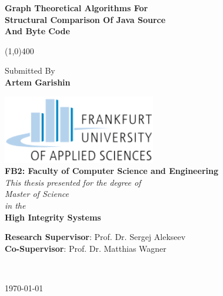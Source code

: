 \documentclass{report}
\newcommand{\Hline}{\par
  \begin{center}
   \line(1,0){400}
   \end{center}
}
\begin{document}


\begin{titlepage}
\begin{center}


{\huge \bfseries Graph Theoretical Algorithms For }\\[0.3cm]
{\huge \bfseries Structural Comparison Of Java Source}\\[0.3cm] %
{\huge \bfseries  And Byte Code }\\[0.3cm]
\Hline

\begin{center}
\large{Submitted By}\\[0.2cm]
\textbf{\Large{Artem Garishin}}\\[2cm]
\end{center}

\includegraphics[width=0.50\textwidth]{Figures/FH_logo}\\[0.5cm]
\textbf{\large FB2: Faculty of Computer Science and Engineering}\\[1cm]


\large \textit{This thesis presented for the degree of\\ Master of Science} \\
\textit{in the}\\[0.2cm]
\textbf{\textcolor{navyblue}{High Integrity Systems}}\\[2.5cm] %

\begin{center}


\begin{varwidth}{0.8\textwidth}
\raggedright
\textbf{Research Supervisor}: {Prof. Dr. Sergej Alekseev}\\[0.2cm] %
\textbf{Co-Supervisor}: {Prof. Dr. Matthias Wagner}\\ %
[3cm]
\end{varwidth}\\[3cm]
\end{center}



{\large \mydate\today}\\[1cm] %

\vfill

\end{center}

\end{titlepage}
\end{document}
